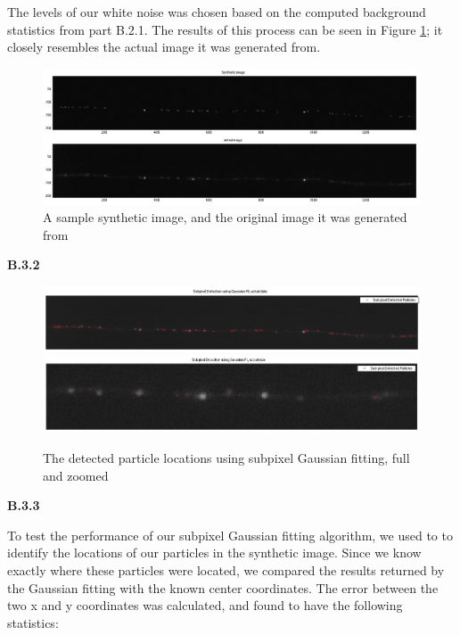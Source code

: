 \documentclass{article}
\begin{document}
The levels of our white noise was chosen based on the computed background statistics from part B.2.1. The results of this process can be seen in Figure \ref{fig:syntheticImage}; it closely resembles the actual image it was generated from.

\begin{figure}[h]
\centering
\includegraphics[width=16cm]{figures/synthetic_image.png}
\caption{A sample synthetic image, and the original image it was generated from}
\label{fig:syntheticImage}
\end{figure}


\textbf{B.3.2}

\begin{figure}[h]
\centering
\includegraphics[width=16cm]{figures/subpixel_real_full.png}
\includegraphics[width=16cm]{figures/subpixel_real_zoom.png}
\caption{The detected particle locations using subpixel Gaussian fitting, full and zoomed}
\label{fig:subpixelReal}
\end{figure}


\textbf{B.3.3}

To test the performance of our subpixel Gaussian fitting algorithm, we used to to identify the locations of our particles in the synthetic image. Since we know exactly where these particles were located, we compared the results returned by the Gaussian fitting with the known center coordinates. The error between the two x and y coordinates was calculated, and found to have the following statistics:
\end{document}
